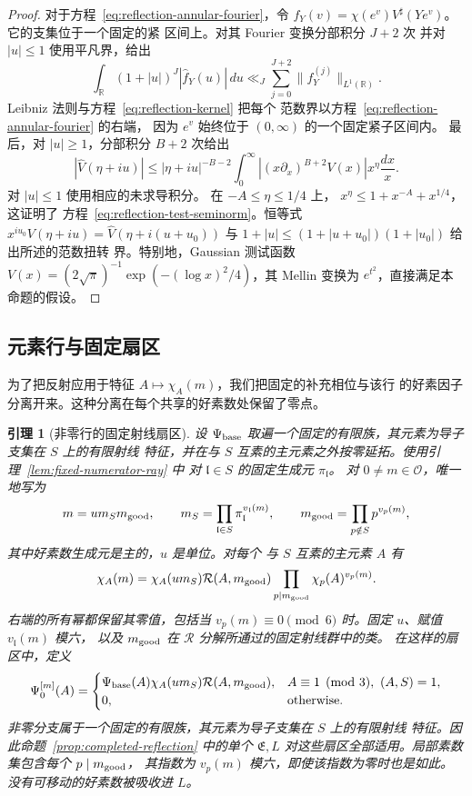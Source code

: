 \documentclass[11pt,a4paper]{article}
\numberwithin{equation}{section}
\numberwithin{figure}{section}
\newtheorem{lemma}[theorem]{引理}
\theoremstyle{definition}
\theoremstyle{remark}
\begin{document}
\begin{proof}
对于方程~\eqref{eq:reflection-annular-fourier}，令
$f_Y(v)=\chi(e^v)V^\sharp(Ye^v)$。它的支集位于一个固定的紧
区间上。对其 Fourier 变换分部积分 $J+2$ 次
并对 $|u|\le1$ 使用平凡界，给出
\[
 \int_{\mathbb R}(1+|u|)^J|\widehat f_Y(u)|\,du
 \ll_J\sum_{j=0}^{J+2}\|f_Y^{(j)}\|_{L^1(\mathbb R)}.
\]
Leibniz 法则与方程~\eqref{eq:reflection-kernel} 把每个
范数界以方程~\eqref{eq:reflection-annular-fourier} 的右端，
因为 $e^v$ 始终位于 $(0,\infty)$ 的一个固定紧子区间内。
最后，对 $|u|\ge1$，分部积分 $B+2$ 次给出
\[
 |\widehat V(\eta+iu)|
 \le |\eta+iu|^{-B-2}
       \int_0^\infty|(x\partial_x)^{B+2}V(x)|x^\eta\frac{dx}{x}.
\]
对 $|u|\le1$ 使用相应的未求导积分。
在 $-A\le\eta\le1/4$ 上，
$x^\eta\le1+x^{-A}+x^{1/4}$，这证明了
方程~\eqref{eq:reflection-test-seminorm}。恒等式
$\widehat{x^{iu_0}V}(\eta+iu)=\widehat V(\eta+i(u+u_0))$
与 $1+|u|\le(1+|u+u_0|)(1+|u_0|)$ 给出所述的范数扭转
界。特别地，Gaussian 测试函数
$V(x)=(2\sqrt\pi)^{-1}\exp(- (\log x)^2/4)$，其 Mellin 变换为
$e^{t^2}$，直接满足本命题的假设。
\end{proof}

\subsection{元素行与固定扇区}

为了把反射应用于特征 $A\mapsto\chi_A(m)$，我们把固定的补充相位与该行
的好素因子分离开来。这种分离在每个共享的好素数处保留了零点。

\begin{lemma}[非零行的固定射线扇区]
\label{lem:reflection-row-sectors}
设 $\Psi_{\rm base}$ 取遍一个固定的有限族，其元素为导子支集在 $S$ 上的有限射线
特征，并在与 $S$ 互素的主元素之外按零延拓。使用引理~\ref{lem:fixed-numerator-ray} 中
对 $\mathfrak l\in S$ 的固定生成元 $\pi_{\mathfrak l}$。
对 $0\ne m\in\mathcal O$，唯一地写为
\[
 m=u m_Sm_{\rm good},\qquad
 m_S=\prod_{\mathfrak l\in S}\pi_{\mathfrak l}^{v_{\mathfrak l}(m)},\qquad
 m_{\rm good}=\prod_{p\notin S}p^{v_p(m)},
\]
其中好素数生成元是主的，$u$ 是单位。对每个
与 $S$ 互素的主元素 $A$ 有
\begin{equation}\label{eq:reflection-row-reduction}
 \chi_A(m)=\chi_A(u m_S)\mathcal R(A,m_{\rm good})
       \prod_{p\mid m_{\rm good}}\chi_p(A)^{v_p(m)}.
\end{equation}
右端的所有幂都保留其零值，包括当
$v_p(m)\equiv0\pmod6$ 时。固定 $u$、赋值 $v_{\mathfrak l}(m)$ 模六，
以及 $m_{\rm good}$ 在 $\mathcal R$ 分解所通过的固定射线群中的类。
在这样的扇区中，定义
\begin{equation}\label{eq:reflection-sector-character}
 \Psi_0^{[m]}(A)=
 \begin{cases}
 \Psi_{\rm base}(A)\chi_A(u m_S)\mathcal R(A,m_{\rm good}),
       &A\equiv1\pmod3,\ (A,S)=1,\\
 0,&\text{otherwise}.
 \end{cases}
\end{equation}
非零分支属于一个固定的有限族，其元素为导子支集在 $S$ 上的有限射线
特征。因此命题~\ref{prop:completed-reflection} 中的单个
$\mathfrak E,L$ 对这些扇区全部适用。局部素数集包含每个 $p\mid m_{\rm good}$，
其指数为 $v_p(m)$ 模六，即使该指数为零时也是如此。
没有可移动的好素数被吸收进 $L$。
\end{lemma}
\end{document}
